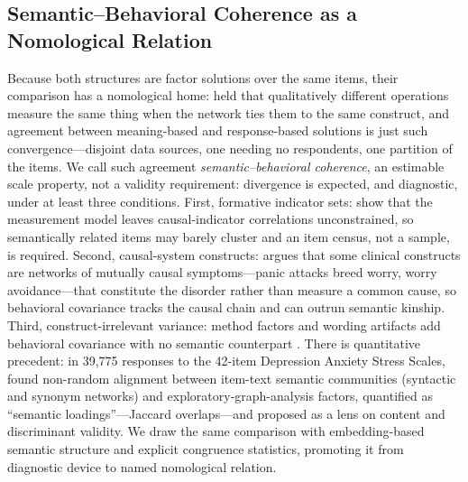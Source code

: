 \subsection{Semantic--Behavioral Coherence as a Nomological Relation}

Because both structures are factor solutions over the same items, their comparison has a nomological home: \citet{cronbach-meehl-1955} held that qualitatively different operations measure the same thing when the network ties them to the same construct, and agreement between meaning-based and response-based solutions is just such convergence---disjoint data sources, one needing no respondents, one partition of the items. We call such agreement \emph{semantic--behavioral coherence}, an estimable scale property, not a validity requirement: divergence is expected, and diagnostic, under at least three conditions. First, formative indicator sets: \citet{bollen-lennox-1991} show that the measurement model leaves causal-indicator correlations unconstrained, so semantically related items may barely cluster and an item census, not a sample, is required. Second, causal-system constructs: \citet{borsboom-2008} argues that some clinical constructs are networks of mutually causal symptoms---panic attacks breed worry, worry avoidance---that constitute the disorder rather than measure a common cause, so behavioral covariance tracks the causal chain and can outrun semantic kinship. Third, construct-irrelevant variance: method factors and wording artifacts add behavioral covariance with no semantic counterpart \citep{messick-1995}. There is quantitative precedent: in 39{,}775 responses to the 42-item Depression Anxiety Stress Scales, \citet{stanghellini-etal-2024} found non-random alignment between item-text semantic communities (syntactic and synonym networks) and exploratory-graph-analysis factors, quantified as ``semantic loadings''---Jaccard overlaps---and proposed as a lens on content and discriminant validity. We draw the same comparison with embedding-based semantic structure and explicit congruence statistics, promoting it from diagnostic device to named nomological relation.
